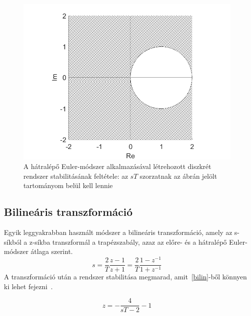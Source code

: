 \begin{figure}[H]
    \centering
    \includegraphics[scale=0.5]{figures/bwEulerS.png}
    \caption{A hátralépő Euler-módszer alkalmazásával létrehozott diszkrét rendszer stabilitásának feltétele: az $sT$ szorzatnak az ábrán jelölt tartományom belül kell lennie}
\end{figure}

\subsection{Bilineáris transzformáció}

Egyik leggyakrabban használt módszer a bilineáris transzformáció, amely az s-síkból a z-síkba transzformál a trapézszabály, azaz 
az előre- és a hátralépő Euler-módszer átlaga szerint.
\begin{equation}
    s=\frac{2}{T}\frac{z-1}{z+1}=\frac{2}{T}\frac{1-z^{-1}}{1+z^{-1}}
    \label{bilin}
\end{equation}
A transzformáció után a rendszer stabilitása megmarad, amit~\ref{bilin}-ből könnyen ki lehet fejezni~\cite{transformations}.

\begin{equation}
    z=-\frac{4}{sT-2}-1
\end{equation}

